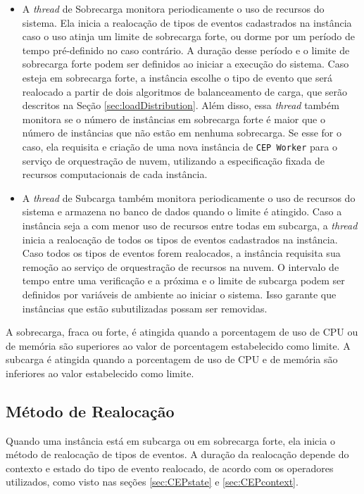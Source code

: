 \begin{itemize}
\item A \textit{thread} de Sobrecarga monitora periodicamente o uso de recursos do sistema. Ela inicia a realocação de tipos de eventos cadastrados na instância caso o uso atinja um limite de sobrecarga forte, ou dorme por um período de tempo pré-definido no caso contrário. A duração desse período e o limite de sobrecarga forte podem ser definidos ao iniciar a execução do sistema.
Caso esteja em sobrecarga forte, a instância escolhe o tipo de evento que será realocado a partir de dois algoritmos de balanceamento de carga, que serão descritos na Seção \ref{sec:loadDistribution}. Além disso, essa \textit{thread} também monitora se o número de instâncias em sobrecarga forte é maior que o número de instâncias que não estão em nenhuma sobrecarga. Se esse for o caso, ela requisita e criação de uma nova instância de \texttt{CEP Worker} para o serviço de orquestração de nuvem, utilizando a especificação fixada de recursos computacionais de cada instância. 


\item A \textit{thread} de Subcarga também monitora periodicamente o uso de recursos do sistema e armazena no banco de dados quando o limite é atingido. Caso a instância seja a com menor uso de recursos entre todas em subcarga, a \textit{thread} inicia a realocação de todos os tipos de eventos cadastrados na instância. Caso todos os tipos de eventos forem realocados, a instância requisita sua remoção ao serviço de orquestração de recursos na nuvem. O intervalo de tempo entre uma verificação e a próxima e o limite de subcarga podem ser definidos por variáveis de ambiente ao iniciar o sistema. Isso garante que instâncias que estão subutilizadas possam ser removidas.
  
\end{itemize}

A sobrecarga, fraca ou forte, é atingida quando a porcentagem de uso de CPU ou de memória são superiores ao valor de porcentagem estabelecido como limite. A subcarga é atingida quando a porcentagem de uso de CPU e de memória são inferiores ao valor estabelecido como limite. 


\subsection{Método de Realocação}

Quando uma instância está em subcarga ou em sobrecarga forte, ela inicia o método de realocação de tipos de eventos. A duração da realocação depende do contexto e estado do tipo de evento realocado, de acordo com os operadores utilizados, como visto nas seções \ref{sec:CEPstate} e \ref{sec:CEPcontext}.

